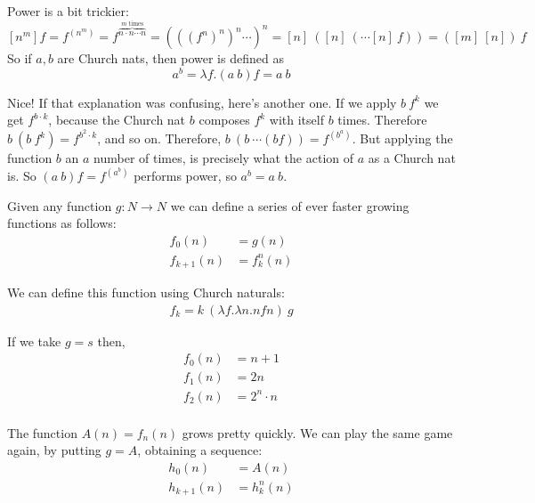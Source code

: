 \documentclass[a4paper, 11pt]{article}
\theoremstyle{definition}
\begin{document}
Power is a bit trickier:
\[
  [n^m] f = f^{(n^m)} = f^{\overbrace{n\cdot n \cdots n}^{m\text{ times}}} = (((f^n)^n)^n \cdots)^n = [n]\ ([n]\ (\cdots [n]\ f)) = ([m]\ [n])\ f
\]
So if $a,b$ are Church nats, then power is defined as
\[
  a^b = \lambda f. (a\ b) f = a\ b
\]

Nice! If that explanation was confusing, here's another one. If we apply $b\ f^k$ we get $f^{b\cdot k}$, because the Church nat $b$ composes $f^k$ with itself $b$ times. Therefore $b\ (b\ f^k) = f^{b^2 \cdot k}$, and so on. Therefore, $b\ (b\ \cdots (b f)) = f^{(b^a)}$. But applying the function $b$ an $a$ number of times, is precisely what the action of $a$ as a Church nat is. So $(a\ b) f = f^{(a^b)}$ performs power, so $a^b = a\ b$.

Given any function $g : N \to N$ we can define a series of ever faster growing functions as follows:
\begin{align*}
  f_0(n) &= g(n)\\
  f_{k+1}(n) &= f^n_k(n)
\end{align*}

We can define this function using Church naturals:
\begin{align*}
  f_k = k\ (\lambda f. \lambda n. n f n)\ g
\end{align*}

If we take $g = s$ then,
\begin{align*}
  f_0(n) &= n+1\\
  f_1(n) &= 2n\\
  f_2(n) &= 2^n \cdot n\\
\end{align*}

The function $A(n) = f_n(n)$ grows pretty quickly. We can play the same game again, by putting $g = A$, obtaining a sequence:
\begin{align*}
  h_0(n) &= A(n)\\
  h_{k+1}(n) &= h^n_k(n)
\end{align*}
\end{document}
